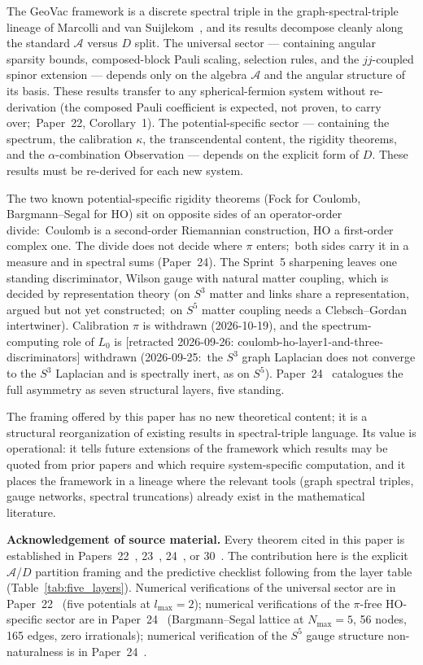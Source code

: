 \documentclass[twocolumn,pra,amsmath,amssymb,superscriptaddress]{revtex4-2}
\begin{document}
The GeoVac framework is a discrete spectral triple in the
graph-spectral-triple lineage of Marcolli and van
Suijlekom~\cite{marcolli_vs2014}, and its results decompose cleanly
along the standard $\mathcal{A}$ versus $D$ split.  The universal
sector --- containing angular sparsity bounds, composed-block Pauli
scaling, selection rules, and the $jj$-coupled spinor extension ---
depends only on the algebra $\mathcal{A}$ and the angular structure
of its basis.  These results transfer to any spherical-fermion system
without re-derivation (the composed Pauli coefficient is expected, not
proven, to carry over;\ Paper~22, Corollary~1).  The potential-specific sector --- containing
the spectrum, the calibration $\kappa$, the transcendental content,
the rigidity theorems, and the $\alpha$-combination Observation --- depends on
the explicit form of $D$.  These results must be re-derived for each
new system.

The two known potential-specific rigidity theorems (Fock for
Coulomb, Bargmann--Segal for HO) sit on opposite sides of an
operator-order divide:\ Coulomb is a second-order Riemannian
construction, HO a first-order complex one.  The divide does not decide
where $\pi$ enters;\ both sides carry it in a measure and in spectral
sums (Paper~24).  The Sprint~5 sharpening leaves one standing
discriminator, Wilson gauge with natural matter coupling, which is
decided by representation theory
(on $S^3$ matter and links share a representation, argued but not yet
constructed;\ on $S^5$ matter coupling needs a Clebsch--Gordan
intertwiner).  Calibration $\pi$ is withdrawn (2026-10-19), and the
spectrum-computing role of $L_0$ is [retracted 2026-09-26: coulomb-ho-layer1-and-three-discriminators]
withdrawn (2026-09-25:\ the $S^3$ graph Laplacian does not converge to
the $S^3$ Laplacian and is spectrally inert, as on $S^5$).
Paper~24~\cite{paper24} catalogues the full asymmetry as seven
structural layers, five standing.

The framing offered by this paper has no new theoretical content; it
is a structural reorganization of existing results in
spectral-triple language.  Its value is operational: it tells future
extensions of the framework which results may be quoted from prior
papers and which require system-specific computation, and it places
the framework in a lineage where the relevant tools (graph spectral
triples, gauge networks, spectral truncations) already exist in the
mathematical literature.

\medskip\noindent\textbf{Acknowledgement of source material.}  Every
theorem cited in this paper is established in
Papers~22~\cite{paper22}, 23~\cite{paper23}, 24~\cite{paper24},
or 30~\cite{paper30}.  The contribution here is the explicit
$\mathcal{A}$/$D$ partition framing and the predictive checklist
following from the layer table
(Table~\ref{tab:five_layers}).  Numerical verifications of the
universal sector are in Paper~22~\cite{paper22} (five potentials at
$l_{\max} = 2$); numerical verifications of the $\pi$-free
HO-specific sector are in Paper~24~\cite{paper24}
(Bargmann--Segal lattice at $N_{\max} = 5$, 56 nodes, 165 edges,
zero irrationals); numerical verification of the $S^5$ gauge
structure non-naturalness is in Paper~24~\cite{paper24}.
\end{document}
